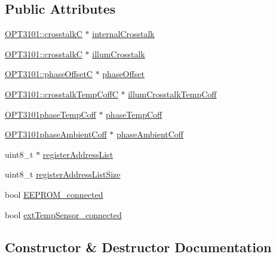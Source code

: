\subsection*{Public Attributes}
\begin{DoxyCompactItemize}
\item 
\mbox{\hyperlink{class_o_p_t3101_1_1crosstalk_c}{O\+P\+T3101\+::crosstalkC}} $\ast$ \mbox{\hyperlink{class_o_p_t3101_calibration_ad437e8a424fe577d83354d12b303a39e}{internal\+Crosstalk}}
\item 
\mbox{\hyperlink{class_o_p_t3101_1_1crosstalk_c}{O\+P\+T3101\+::crosstalkC}} $\ast$ \mbox{\hyperlink{class_o_p_t3101_calibration_a325c4a2d0e233044717af30a7fa1bbc3}{illum\+Crosstalk}}
\item 
\mbox{\hyperlink{class_o_p_t3101_1_1phase_offset_c}{O\+P\+T3101\+::phase\+OffsetC}} $\ast$ \mbox{\hyperlink{class_o_p_t3101_calibration_a5b412c18abbf34deff2fc6902f6bcb96}{phase\+Offset}}
\item 
\mbox{\hyperlink{class_o_p_t3101_1_1crosstalk_temp_coff_c}{O\+P\+T3101\+::crosstalk\+Temp\+CoffC}} $\ast$ \mbox{\hyperlink{class_o_p_t3101_calibration_a4f7cbff7a4cd3401e4d5f4bda8fcddfb}{illum\+Crosstalk\+Temp\+Coff}}
\item 
\mbox{\hyperlink{class_o_p_t3101phase_temp_coff}{O\+P\+T3101phase\+Temp\+Coff}} $\ast$ \mbox{\hyperlink{class_o_p_t3101_calibration_a731ed6a15bd11bd5b4aaa5fc5897b50e}{phase\+Temp\+Coff}}
\item 
\mbox{\hyperlink{class_o_p_t3101phase_ambient_coff}{O\+P\+T3101phase\+Ambient\+Coff}} $\ast$ \mbox{\hyperlink{class_o_p_t3101_calibration_ae9a486691abb50456b3d177b6694c6c4}{phase\+Ambient\+Coff}}
\item 
uint8\+\_\+t $\ast$ \mbox{\hyperlink{class_o_p_t3101_calibration_a111d227d3f19d98a2822d130850f3513}{register\+Address\+List}}
\item 
uint8\+\_\+t \mbox{\hyperlink{class_o_p_t3101_calibration_a47b0caca3d9ccfa37b6094a86e1f1235}{register\+Address\+List\+Size}}
\item 
bool \mbox{\hyperlink{class_o_p_t3101_calibration_aeba1794114f60f38656292660120588e}{E\+E\+P\+R\+O\+M\+\_\+connected}}
\item 
bool \mbox{\hyperlink{class_o_p_t3101_calibration_afbec02cfa51222efaa1905bf4f9d9912}{ext\+Temp\+Sensor\+\_\+connected}}
\end{DoxyCompactItemize}


\subsection{Constructor \& Destructor Documentation}
\mbox{\label{class_o_p_t3101_calibration_ab20a3aa586a22bd7ec3f978445ad545b}} 
